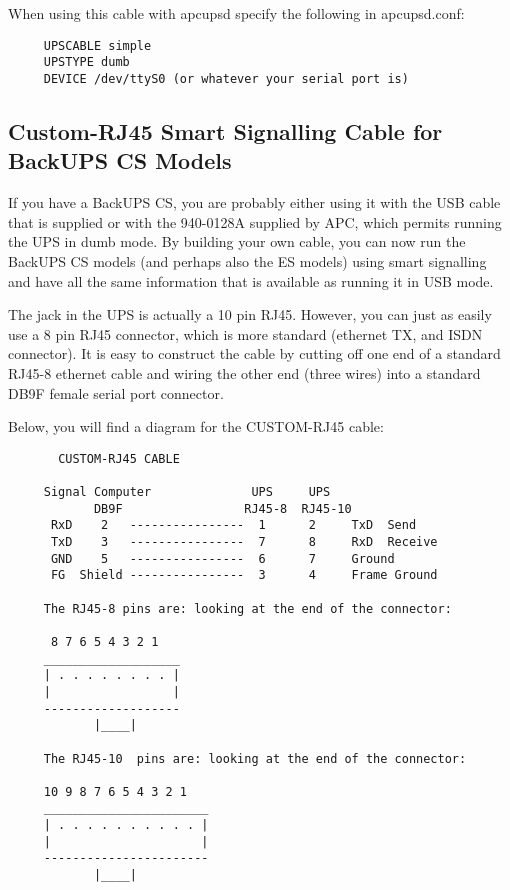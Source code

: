 When using this cable with apcupsd specify the following in apcupsd.conf: 

\footnotesize
\begin{verbatim}
     UPSCABLE simple
     UPSTYPE dumb
     DEVICE /dev/ttyS0 (or whatever your serial port is)
\end{verbatim}
\normalsize

\subsection*{Custom-RJ45 Smart Signalling Cable for BackUPS CS Models}

If you have a BackUPS CS, you are probably either using it with the USB cable
that is supplied or with the 940-0128A supplied by APC, which permits running
the UPS in dumb mode. By building your own cable, you can now run the BackUPS
CS models (and perhaps also the ES models) using smart signalling and have all
the same information that is available as running it in USB mode.  

The jack in the UPS is actually a 10 pin RJ45. However, you can just as easily
use a 8 pin RJ45 connector, which is more standard (ethernet TX, and ISDN
connector). It is easy to construct the cable by cutting off one end of a
standard RJ45-8 ethernet cable and wiring the other end (three wires) into a
standard DB9F female serial port connector.  

Below, you will find a diagram for the CUSTOM-RJ45 cable: 

\footnotesize
\begin{verbatim}
       CUSTOM-RJ45 CABLE
     
     Signal Computer              UPS     UPS
            DB9F                 RJ45-8  RJ45-10
      RxD    2   ----------------  1      2     TxD  Send
      TxD    3   ----------------  7      8     RxD  Receive
      GND    5   ----------------  6      7     Ground
      FG  Shield ----------------  3      4     Frame Ground
     
     The RJ45-8 pins are: looking at the end of the connector:
     
      8 7 6 5 4 3 2 1
     ___________________
     | . . . . . . . . |
     |                 |
     -------------------
            |____|
     
     The RJ45-10  pins are: looking at the end of the connector:
     
     10 9 8 7 6 5 4 3 2 1
     _______________________
     | . . . . . . . . . . |
     |                     |
     -----------------------
            |____|
\end{verbatim}
\normalsize

